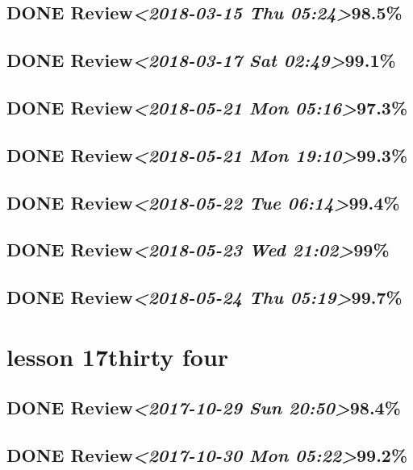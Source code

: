 \documentclass[11pt]{ctexart}
\begin{document}
\subsection{{\bfseries\sffamily DONE} Review\textit{<2018-03-15 Thu 05:24>}98.5\%}
\label{sec:org62fa777}
\subsection{{\bfseries\sffamily DONE} Review\textit{<2018-03-17 Sat 02:49>}99.1\%}
\label{sec:org5dc07cb}
\subsection{{\bfseries\sffamily DONE} Review\textit{<2018-05-21 Mon 05:16>}97.3\%}
\label{sec:org32fd920}
\subsection{{\bfseries\sffamily DONE} Review\textit{<2018-05-21 Mon 19:10>}99.3\%}
\label{sec:orga7f3f55}
\subsection{{\bfseries\sffamily DONE} Review\textit{<2018-05-22 Tue 06:14>}99.4\%}
\label{sec:org10c5988}
\subsection{{\bfseries\sffamily DONE} Review\textit{<2018-05-23 Wed 21:02>}99\%}
\label{sec:org55f5df9}
\subsection{{\bfseries\sffamily DONE} Review\textit{<2018-05-24 Thu 05:19>}99.7\%}
\label{sec:orgdd9b86a}
\section{lesson 17thirty four}
\label{sec:org99ad90a}
\subsection{{\bfseries\sffamily DONE} Review\textit{<2017-10-29 Sun 20:50>}98.4\%}
\label{sec:org66537e1}
\subsection{{\bfseries\sffamily DONE} Review\textit{<2017-10-30 Mon 05:22>}99.2\%}
\label{sec:org717b265}
\end{document}

